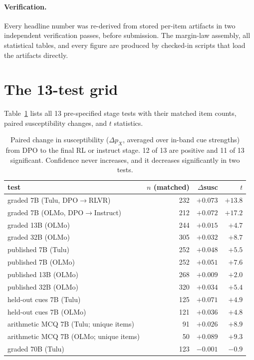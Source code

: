 \documentclass{article}
\begin{document}
\paragraph{Verification.} Every headline number was re-derived from stored per-item artifacts in two independent verification passes, before submission. The margin-law assembly, all statistical tables, and every figure are produced by checked-in scripts that load the artifacts directly.

\section{The 13-test grid}
\label{app:grid}
Table~\ref{tab:grid} lists all 13 pre-specified stage tests with their matched item counts, paired susceptibility changes, and $t$ statistics.
\begin{table}[h]
\centering\small
\begin{tabular}{lrrr}
\toprule
test & $n$ (matched) & $\Delta$susc & $t$ \\
\midrule
graded 7B (Tulu, DPO$\rightarrow$RLVR) & 232 & $+0.073$ & $+13.8$ \\
graded 7B (OLMo, DPO$\rightarrow$Instruct) & 212 & $+0.072$ & $+17.2$ \\
graded 13B (OLMo) & 244 & $+0.015$ & $+4.7$ \\
graded 32B (OLMo) & 305 & $+0.032$ & $+8.7$ \\
published 7B (Tulu) & 252 & $+0.048$ & $+5.5$ \\
published 7B (OLMo) & 252 & $+0.051$ & $+7.6$ \\
published 13B (OLMo) & 268 & $+0.009$ & $+2.0$ \\
published 32B (OLMo) & 320 & $+0.034$ & $+5.4$ \\
held-out cues 7B (Tulu) & 125 & $+0.071$ & $+4.9$ \\
held-out cues 7B (OLMo) & 121 & $+0.036$ & $+4.8$ \\
arithmetic MCQ 7B (Tulu; unique items) & 91 & $+0.026$ & $+8.9$ \\
arithmetic MCQ 7B (OLMo; unique items) & 50 & $+0.089$ & $+9.3$ \\
graded 70B (Tulu) & 123 & $-0.001$ & $-0.9$ \\
\bottomrule
\end{tabular}
\caption{Paired change in susceptibility ($\Delta p_X$, averaged over in-band cue strengths) from DPO to the final RL or instruct stage. 12 of 13 are positive and 11 of 13 significant. Confidence never increases, and it decreases significantly in two tests.
\label{tab:grid}}
\end{table}
\end{document}

